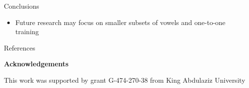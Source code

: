 \documentclass[final,xcolor={cmyk,hyperref}]{beamer}
\begin{document}
\begin{frame}[t]
\begin{columns}[t]
\begin{column}{0.525\linewidth}
\begin{block}{Conclusions}
\begin{itemize}
  \item
    Future research may focus on smaller subsets of vowels and  one-to-one training
\end{itemize}
\end{block}

\begin{block}{\small References}
  \renewcommand\bibfont{\tiny}
  \printbibliography
\end{block}

\vspace*{-0.125in}
\textbf{Acknowledgements}

  This work was supported by
  grant G-474-270-38 from King Abdulaziz University

\end{column}

\end{columns}

\end{frame}
\end{document}
